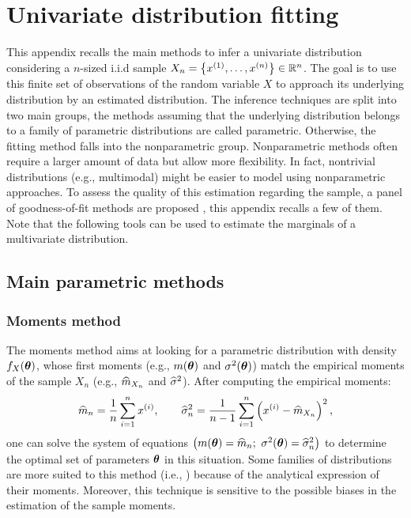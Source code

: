 \chapter{Univariate distribution fitting}
\label{apx:A}

This appendix recalls the main methods to infer a univariate distribution considering a $n$-sized i.i.d sample $X_n = \left\{x^{(1)}, \dots, x^{(n)}\right\} \in \mathbb{R}^{n}$. 
The goal is to use this finite set of observations of the random variable $X$ to approach its underlying distribution by an estimated distribution.
The inference techniques are split into two main groups, the methods assuming that the underlying distribution belongs to a family of parametric distributions are called parametric. 
Otherwise, the fitting method falls into the nonparametric group. 
Nonparametric methods often require a larger amount of data but allow more flexibility. 
In fact, nontrivial distributions (e.g., multimodal) might be easier to model using nonparametric approaches.
To assess the quality of this estimation regarding the sample, a panel of goodness-of-fit methods are proposed , this appendix recalls a few of them. 
Note that the following tools can be used to estimate the marginals of a multivariate distribution.

\section{Main parametric methods}

\subsection*{Moments method}
The moments method aims at looking for a parametric distribution with density $f_X({\boldsymbol{\theta}})$, whose first moments (e.g., $m({\boldsymbol{\theta}})$ and $\sigma^2({\boldsymbol{\theta}})$) match 
the empirical moments of the sample $X_n$ (e.g., $\widehat{m}_{X_n}$ and $\widehat{\sigma}^2$). After computing the empirical moments: 
\begin{equation}
    \widehat{m}_{n} = \frac1n \sum_{i=1}^{n} x^{(i)}, \qquad \widehat{\sigma}^2_n = \frac{1}{n-1} \sum_{i=1}^{n} \left(x^{(i)} - \widehat{m}_{X_n}\right)^2,
\end{equation} 
one can solve the system of equations $\left(m(\btheta) = \what{m}_{n}; \ \sigma^2(\btheta) = \what{\sigma}_n^2\right)$ to determine the optimal set of parameters ${\boldsymbol{\theta}}$ in this situation. 
Some families of distributions are more suited to this method (i.e., ) because of the analytical expression of their moments. 
Moreover, this technique is sensitive to the possible biases in the estimation of the sample moments.


